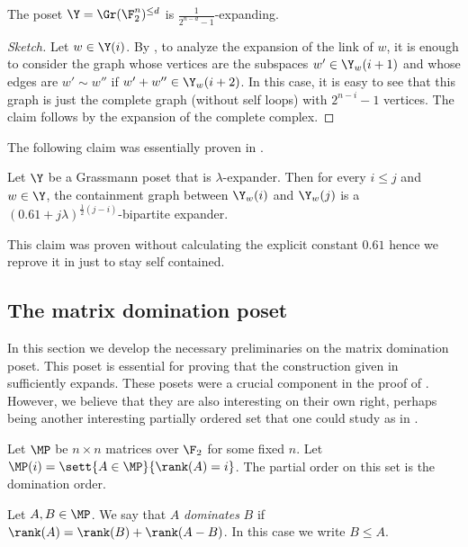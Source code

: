 \begin{claim} \label{claim:link-in-Grassmann-expands}
    The poset \(\Y = \Gr(\F_2^n)^{\leq d}\) is \(\frac{1}{2^{n-d}-1}\)-expanding.
\end{claim}
\begin{proof}[Sketch]
    Let \(w \in \Y(i)\). By , to analyze the expansion of the link of \(w\), it is enough to consider the graph whose vertices are the subspaces \(w' \in \Y_{w}(i+1)\) and whose edges are \(w' \sim w''\) if \(w' + w'' \in \Y_w (i+2)\). In this case, it is easy to see that this graph is just the complete graph (without self loops) with \(2^{n-i}-1\) vertices. The claim follows by the expansion of the complete complex.
\end{proof}

The following claim was essentially proven in \cite{DiksteinDFH2018}.
\begin{claim} \label{claim:loc-to-glob-grassmann}
    Let \(\Y\) be a Grassmann poset that is \(\lambda\)-expander. Then for every \(i \leq j\) and \(w \in \Y\), the containment graph between \(\Y_w(i)\) and \(\Y_w(j)\) is a \(\left (0.61 + j\lambda \right )^{\frac{1}{2}(j-i)}\)-bipartite expander.%
\end{claim}
This claim was proven \cite{DiksteinDFH2018} without calculating the explicit constant \(0.61\) hence we reprove it in  just to stay self contained.

\subsection{The matrix domination poset} \label{sec:def-of-domination-relation}
In this section we develop the necessary preliminaries on the matrix domination poset. This poset is essential for proving that the construction given in  sufficiently expands. These posets were a crucial component in the proof of \cite{Golowich2023}. However, we believe that they are also interesting on their own right, perhaps being another interesting partially ordered set that one could study as in \cite{DiksteinDFH2018,kaufmanT2021garland}.

Let \(\MP\) be \(n \times n\) matrices over \(\F_2\) for some fixed \(n\). Let \(\MP(i) = \sett{A \in \MP}{\rank(A) = i}\). The partial order on this set is the domination order.
\begin{definition}
    Let \(A,B \in \MP\). We say that \(A\) \emph{dominates} \(B\) if \(\rank(A) = \rank(B) + \rank(A-B)\). In this case we write \(B \leq A\).
\end{definition}

